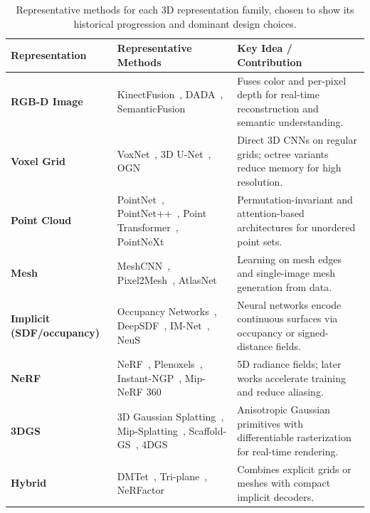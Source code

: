 \begin{table}[!t]
\centering
\caption{Representative methods for each 3D representation family, chosen to show its historical progression and dominant design choices.}
\label{tab:p2_s4_3d_representative_methods}
\fontsize{9}{11}\selectfont
\setlength{\tabcolsep}{4pt}
\begin{tabular}{L{0.19\textwidth}L{0.4\textwidth} L{0.4\textwidth}}
\toprule
\textbf{Representation} & \textbf{Representative Methods} & \textbf{Key Idea / Contribution} \\
\midrule
\textbf{RGB-D Image} & KinectFusion~\cite{newcombe2011kinectfusion}, DADA~\cite{vu2019dada}, SemanticFusion~\cite{mccormac2017semanticfusion} & Fuses color and per-pixel depth for real-time reconstruction and semantic understanding. \\
\textbf{Voxel Grid} & VoxNet~\cite{maturana2015voxnet}, 3D U-Net~\cite{cciccek20163d}, OGN~\cite{tatarchenko2017octree} & Direct 3D CNNs on regular grids; octree variants reduce memory for high resolution. \\
\textbf{Point Cloud} & PointNet~\cite{qi2017pointnet}, PointNet++~\cite{qi2017pointnetplus}, Point Transformer~\cite{zhao2021point}, PointNeXt~\cite{qian2022pointnext} & Permutation-invariant and attention-based architectures for unordered point sets. \\
\textbf{Mesh} & MeshCNN~\cite{hanocka2019meshcnn}, Pixel2Mesh~\cite{wang2018pixel2mesh}, AtlasNet~\cite{groueix2018papier} & Learning on mesh edges and single-image mesh generation from data. \\
\textbf{Implicit (SDF/occupancy)} & Occupancy Networks~\cite{mescheder2019occupancy}, DeepSDF~\cite{park2019deepsdf}, IM-Net~\cite{chen2019imnet}, NeuS~\cite{wang2021neus} & Neural networks encode continuous surfaces via occupancy or signed-distance fields. \\
\textbf{NeRF} & NeRF~\cite{mildenhall2021nerf}, Plenoxels~\cite{fridovich2022plenoxels}, Instant-NGP~\cite{muller2022instant}, Mip-NeRF 360~\cite{barron2022mip} & 5D radiance fields; later works accelerate training and reduce aliasing. \\
\textbf{3DGS} & 3D Gaussian Splatting~\cite{kerbl20233d}, Mip-Splatting~\cite{yu2024mip}, Scaffold-GS~\cite{lu2024scaffold}, 4DGS~\cite{wu20244d} & Anisotropic Gaussian primitives with differentiable rasterization for real-time rendering. \\
\textbf{Hybrid} & DMTet~\cite{shen2021deep}, Tri-plane~\cite{chan2022efficient}, NeRFactor~\cite{zhang2021nerfactor} & Combines explicit grids or meshes with compact implicit decoders. \\
\bottomrule
\end{tabular}
\end{table}


